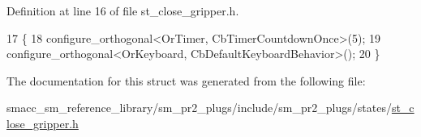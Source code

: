 Definition at line 16 of file st\+\_\+close\+\_\+gripper.\+h.


\begin{DoxyCode}
17     \{
18         configure\_orthogonal<OrTimer,  CbTimerCountdownOnce>(5);    
19         configure\_orthogonal<OrKeyboard, CbDefaultKeyboardBehavior>();
20     \}
\end{DoxyCode}


The documentation for this struct was generated from the following file\+:\begin{DoxyCompactItemize}
\item 
smacc\+\_\+sm\+\_\+reference\+\_\+library/sm\+\_\+pr2\+\_\+plugs/include/sm\+\_\+pr2\+\_\+plugs/states/\hyperlink{sm__pr2__plugs_2include_2sm__pr2__plugs_2states_2st__close__gripper_8h}{st\+\_\+close\+\_\+gripper.\+h}\end{DoxyCompactItemize}
